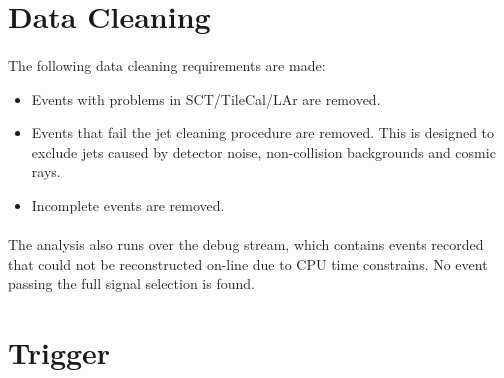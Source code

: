 \section{Data Cleaning}
\label{evt-sel:cleaning}
\paragraph{}
The following data cleaning requirements are made:
\begin{itemize}
\item Events with problems in SCT/TileCal/LAr are removed.
\item Events that fail the jet cleaning procedure are removed. This is designed to exclude jets caused by detector noise, non-collision backgrounds and cosmic rays. 
\item Incomplete events are removed.
\end{itemize}
\paragraph{}
The analysis also runs over the debug stream, which contains events recorded that could not be reconstructed on-line due to CPU time constrains. No event passing the full signal selection is found.

\section{Trigger}
\label{evt-sel:trig}

